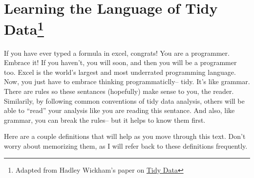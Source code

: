 \documentclass[]{book}
\begin{document}
\section[Learning the Language of Tidy Data]{\texorpdfstring{Learning
the Language of Tidy Data\footnote{Adapted from Hadley Wickham's paper
  on \href{https://vita.had.co.nz/papers/tidy-data.pdf}{Tidy Data}}}{Learning the Language of Tidy Data}}\label{learning-the-language-of-tidy-data}

If you have ever typed a formula in excel, congrats! You are a
programmer. Embrace it! If you haven't, you will soon, and then you will
be a programmer too. Excel is the world's largest and most underrated
programming language. Now, you just have to embrace thinking
programmaticlly-- tidy. It's like grammar. There are rules so these
sentances (hopefully) make sense to you, the reader. Similarily, by
following common conventions of tidy data analysis, others will be able
to ``read'' your analysis like you are reading this sentance. And also,
like grammar, you can break the rules-- but it helps to know them first.

Here are a couple definitions that will help as you move through this
text. Don't worry about memorizing them, as I will refer back to these
definitions frequently.
\end{document}
